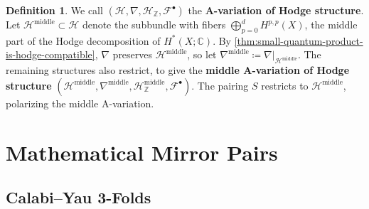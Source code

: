 \documentclass{report}
\theoremstyle{plain}
\theoremstyle{definition}
\newtheorem{definition}[theorem]{Definition}
\theoremstyle{remark}
\newcommand{\bC}{\mathbb{C}}
\newcommand{\bZ}{\mathbb{Z}}
\newcommand{\cF}{\mathcal{F}}
\newcommand{\cH}{\mathcal{H}}
\begin{document}
\begin{definition}
  We call $(\cH, \nabla, \cH_{\bZ}, \cF^\bullet)$ the {\bf A-variation
    of Hodge structure}. Let $\cH^{\text{middle}} \subset \cH$ denote
  the subbundle with fibers $\bigoplus_{p=0}^d H^{p,p}(X)$, the middle
  part of the Hodge decomposition of $H^*(X; \bC)$. By
  \ref{thm:small-quantum-product-is-hodge-compatible}, $\nabla$
  preserves $\cH^{\text{middle}}$, so let $\nabla^{\text{middle}}
  \coloneqq \nabla|_{\cH^{\text{middle}}}$. The remaining structures
  also restrict, to give the {\bf middle A-variation of Hodge
    structure} $(\cH^{\text{middle}}, \nabla^{\text{middle}},
  \cH_{\bZ}^{\text{middle}}, \cF^\bullet)$. The pairing $S$ restricts
  to $\cH^{\text{middle}}$, polarizing the middle A-variation.
\end{definition}

\section{Mathematical Mirror Pairs}

\subsection{Calabi--Yau 3-Folds}
\end{document}
